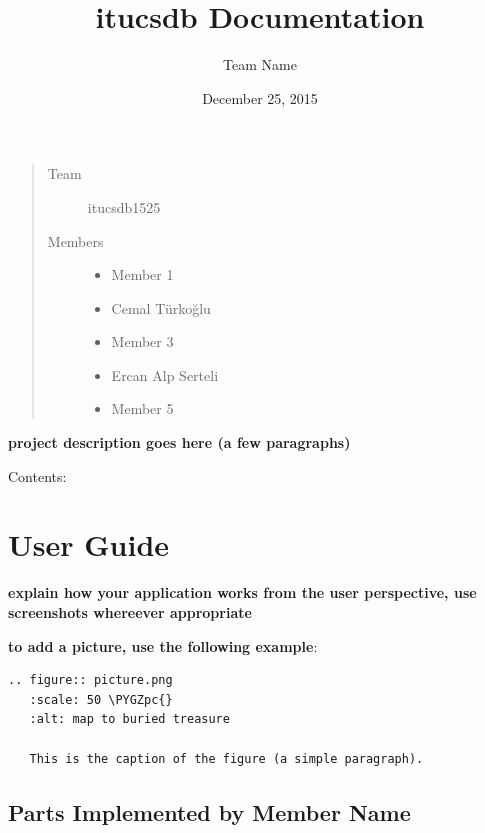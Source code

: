 \documentclass[a4paper,10pt,english]{sphinxmanual}
\title{itucsdb Documentation}
\date{December 25, 2015}
\author{Team Name}
\def\PYGZpc{\char`\%}
\begin{document}
\maketitle
\tableofcontents
{}\label{index::doc}

\begin{quote}\begin{description}
\item[{Team}] \leavevmode
itucsdb1525

\item[{Members}] \leavevmode\begin{itemize}
\item {} 
Member 1

\item {} 
Cemal Türkoğlu

\item {} 
Member 3

\item {} 
Ercan Alp Serteli

\item {} 
Member 5

\end{itemize}

\end{description}\end{quote}

\textbf{project description goes here (a few paragraphs)}

Contents:


\chapter{User Guide}
\label{user/index:user-guide}\label{user/index:welcome-to-itucsdb1525-s-documentation}\label{user/index::doc}
\textbf{explain how your application works from the user perspective, use
screenshots whereever appropriate}

\textbf{to add a picture, use the following example}:

\begin{Verbatim}[commandchars=\\\{\}]
.. figure:: picture.png
   :scale: 50 \PYGZpc{}
   :alt: map to buried treasure

   This is the caption of the figure (a simple paragraph).
\end{Verbatim}


\section{Parts Implemented by Member Name}
\label{user/member1:parts-implemented-by-member-name}\label{user/member1::doc}
\end{document}
